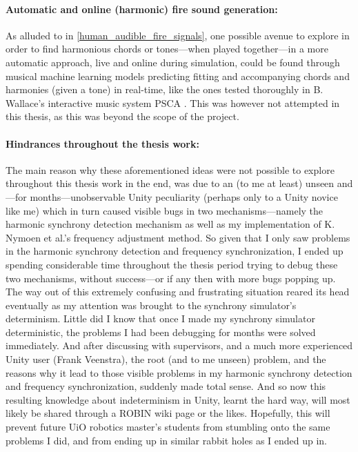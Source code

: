 	\paragraph{Automatic and online (harmonic) fire sound generation:}
	As alluded to in \ref{human_audible_fire_signals}, one possible avenue to explore in order to find harmonious chords or tones—when played together—in a more automatic approach, live and online during simulation, could be found through musical machine learning models predicting fitting and accompanying chords and harmonies (given a tone) in real-time, like the ones tested thoroughly in B. Wallace's interactive music system PSCA \cite{wallace_PSCA}. This was however not attempted in this thesis, as this was beyond the scope of the project.

	\paragraph{Hindrances throughout the thesis work:}
	The main reason why these aforementioned ideas were not possible to explore throughout this thesis work in the end, was due to an (to me at least) unseen and—for months—unobservable Unity peculiarity (perhaps only to a Unity novice like me) which in turn caused visible bugs in two mechanisms—namely the harmonic synchrony detection mechanism as well as my implementation of K. Nymoen et al.'s frequency adjustment method. So given that I only saw problems in the harmonic synchrony detection and frequency synchronization, I ended up spending considerable time throughout the thesis period trying to debug these two mechanisms, without success—or if any then with more bugs popping up. The way out of this extremely confusing and frustrating situation reared its head eventually as my attention was brought to the synchrony simulator's determinism. Little did I know that once I made my synchrony simulator deterministic, the problems I had been debugging for months were solved immediately. And after discussing with supervisors, and a much more experienced Unity user (Frank Veenstra), the root (and to me unseen) problem, and the reasons why it lead to those visible problems in my harmonic synchrony detection and frequency synchronization, suddenly made total sense. And so now this resulting knowledge about indeterminism in Unity, learnt the hard way, will most likely be shared through a ROBIN wiki page or the likes. Hopefully, this will prevent future UiO robotics master's students from stumbling onto the same problems I did, and from ending up in similar rabbit holes as I ended up in.
